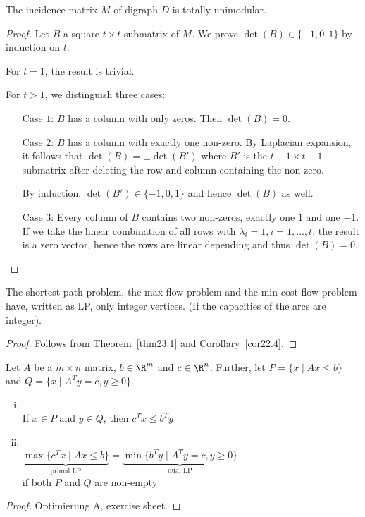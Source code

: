 \begin{lec}[2012-01-19]\end{lec}

\begin{thm}\label{thm23.1}
The incidence matrix $M$ of digraph $D$ is totally unimodular.
\end{thm}
\begin{proof}
Let $B$ a square $t \times t$ submatrix of $M$. We prove $\det(B) \in
\{-1,0,1\}$ by induction on $t$.

For $t = 1$, the result is trivial.

For $t > 1$, we distinguish three cases:

\begin{enumerate}
\item[Case $1$:] $B$ has a column with only zeros. Then $\det(B) = 0$.
\item[Case $2$:] $B$ has a column with exactly one non-zero. By Laplacian
expansion, it follows that $\det(B) = \pm \det(B')$ where $B'$ is the $t-1
\times t-1$ submatrix after deleting the row and column containing the
non-zero.

By induction, $\det(B') \in \{ -1,0,1 \}$ and hence $\det(B)$ as well.
\item[Case $3$:] Every column of $B$ contains two non-zeros, exactly one $1$
and one $-1$. If we take the linear combination of all rows with $\lambda_i
= 1, i = 1, \dots, t$, the result is a zero vector, hence the rows are
linear depending and thus $\det(B) = 0$.
\end{enumerate}
\end{proof}

\begin{cor}\label{cor23.2}
The shortest path problem, the max flow problem and the min cost flow
problem have, written as LP, only integer vertices.
(If the capacities of the arcs are integer).
\end{cor}
\begin{proof}
Follows from Theorem~\ref{thm23.1} and Corollary~\ref{cor22.4}.
\end{proof}

\begin{thm}\label{thm23.3}
Let $A$ be a $m \times n$ matrix, $b \in \R^m$ and $c \in \R^n$. Further,
let $P = \{ x \mid A x \leq b \}$ and $Q = \{ x \mid A^T y = c, y \geq 0 \}$.

\begin{enumerate}[(i)]
\item {} \\
If $x \in P$ and $y \in Q$, then $c^T x \leq b^T y$
\item {} \\
$\underbrace{\max \{ c^T x \mid Ax \leq b \}}_{\text{primal LP}} =
\underbrace{\min \{ b^T y \mid A^T y = c, y \geq 0 \}}_{\text{dual LP}}$ \\
if both $P$ and $Q$ are non-empty
\end{enumerate}
\end{thm}
\begin{proof}
Optimierung A, exercise sheet.
\end{proof}

